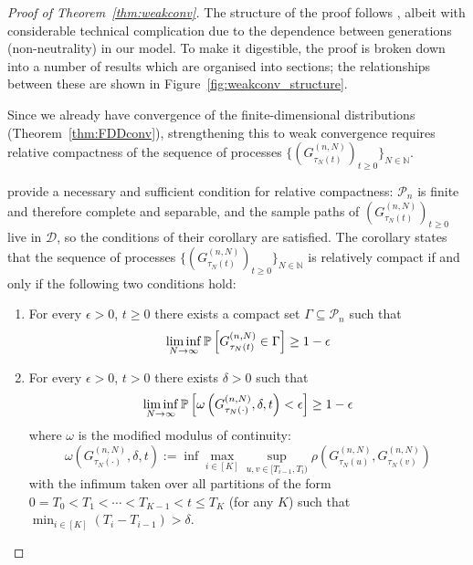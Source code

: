 \begin{proof}[Proof of Theorem~\ref{thm:weakconv}]
The structure of the proof follows \textcite{mohle1999}, albeit with considerable technical complication due to the dependence between generations (non-neutrality) in our model.
To make it digestible, the proof is broken down into a number of results which are organised into sections; the relationships between these are shown in Figure~\ref{fig:weakconv_structure}.

Since we already have convergence of the finite-dimensional distributions (Theorem~\ref{thm:FDDconv}), strengthening this to weak convergence requires relative compactness of the sequence of processes $\{ (G_{\tau_N(t)}^{(n,N)})_{t\geq0} \}_{N\in\mathbb{N}}$.

\textcite[Chapter 3, Corollary 7.4]{ethier1986} provide a necessary and sufficient condition for relative compactness: $\mathcal{P}_n$ is finite and therefore complete and separable, and the sample paths of $(G_{\tau_N(t)}^{(n,N)})_{t\geq0}$ live in $\mathcal{D}$, so the conditions of their corollary are satisfied.
The corollary states that the sequence of processes $\{ (G_{\tau_N(t)}^{(n,N)})_{t\geq0} \}_{N\in\mathbb{N}}$ is relatively compact if and only if the following two conditions hold:
\begin{enumerate}
\item \label{item:relcomp1} For every $\epsilon>0$, $t\geq 0$ there exists a compact set $\Gamma \subseteq \mathcal{P}_n$ such that
\begin{equation*}
\liminf_{N\to\infty} \mathbb{P}\left[ G_{\tau_N(t)}^{(n,N)} \in \Gamma \right] 
\geq 1-\epsilon
\end{equation*}
\item \label{item:relcomp2} For every $\epsilon>0$, $t>0$ there exists $\delta>0$ such that
\begin{equation*}
\liminf_{N\to\infty} \mathbb{P}\left[ \omega\left( G_{\tau_N(\cdot)}^{(n,N)}, \delta, t \right) < \epsilon \right] 
\geq 1-\epsilon
\end{equation*}
where $\omega$ is the modified modulus of continuity:
\begin{equation*}
\omega\left( G_{\tau_N(\cdot)}^{(n,N)}, \delta, t \right) := \inf \max_{i \in [K]} 
        \sup_{u,v \in [T_{i-1}, T_i)} \rho\left( 
        G_{\tau_N(u)}^{(n,N)}, G_{\tau_N(v)}^{(n,N)} \right)
\end{equation*}
with the infimum taken over all partitions of the form $0=T_0<T_1<\cdots <T_{K-1} <t \leq T_K$ (for any $K$) such that $\min_{i\in[K]} (T_i - T_{i-1}) > \delta$. 

\end{enumerate}
\end{proof}
